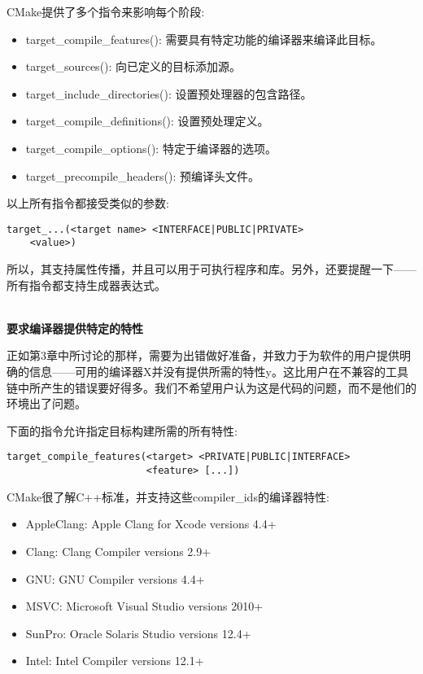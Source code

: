 
CMake提供了多个指令来影响每个阶段:

\begin{itemize}
\item 
target\_compile\_features(): 需要具有特定功能的编译器来编译此目标。

\item 
target\_sources(): 向已定义的目标添加源。

\item 
target\_include\_directories(): 设置预处理器的包含路径。

\item 
target\_compile\_definitions(): 设置预处理定义。

\item 
target\_compile\_options(): 特定于编译器的选项。

\item 
target\_precompile\_headers(): 预编译头文件。
\end{itemize}

以上所有指令都接受类似的参数:

\begin{lstlisting}[style=styleCMake]
target_...(<target name> <INTERFACE|PUBLIC|PRIVATE>
	<value>)
\end{lstlisting}

所以，其支持属性传播，并且可以用于可执行程序和库。另外，还要提醒一下——所有指令都支持生成器表达式。

\hspace*{\fill} \\ %
\noindent
\textbf{要求编译器提供特定的特性}

正如第3章中所讨论的那样，需要为出错做好准备，并致力于为软件的用户提供明确的信息——可用的编译器X并没有提供所需的特性y。这比用户在不兼容的工具链中所产生的错误要好得多。我们不希望用户认为这是代码的问题，而不是他们的环境出了问题。

下面的指令允许指定目标构建所需的所有特性:

\begin{lstlisting}[style=styleCMake]
target_compile_features(<target> <PRIVATE|PUBLIC|INTERFACE>
						<feature> [...])
\end{lstlisting}

CMake很了解C++标准，并支持这些compiler\_ids的编译器特性:

\begin{itemize}
\item 
AppleClang: Apple Clang for Xcode versions 4.4+

\item 
Clang: Clang Compiler versions 2.9+

\item 
GNU: GNU Compiler versions 4.4+

\item 
MSVC: Microsoft Visual Studio versions 2010+

\item 
SunPro: Oracle Solaris Studio versions 12.4+

\item 
Intel: Intel Compiler versions 12.1+
\end{itemize}

